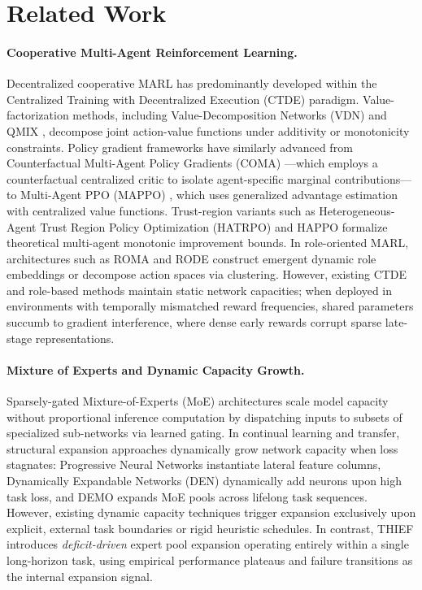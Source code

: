 \section{Related Work}
\label{sec:related}

\paragraph{Cooperative Multi-Agent Reinforcement Learning.}
Decentralized cooperative MARL has predominantly developed within the Centralized Training with Decentralized Execution (CTDE) paradigm. Value-factorization methods, including Value-Decomposition Networks (VDN) \citep{sunehag2018value} and QMIX \citep{rashid2020monotonic}, decompose joint action-value functions under additivity or monotonicity constraints. Policy gradient frameworks have similarly advanced from Counterfactual Multi-Agent Policy Gradients (COMA) \citep{foerster2018counterfactual}---which employs a counterfactual centralized critic to isolate agent-specific marginal contributions---to Multi-Agent PPO (MAPPO) \citep{yu2022surprising}, which uses generalized advantage estimation with centralized value functions. Trust-region variants such as Heterogeneous-Agent Trust Region Policy Optimization (HATRPO) and HAPPO \citep{kuba2022trust} formalize theoretical multi-agent monotonic improvement bounds. In role-oriented MARL, architectures such as ROMA \citep{wang2020roma} and RODE \citep{wang2021rode} construct emergent dynamic role embeddings or decompose action spaces via clustering. However, existing CTDE and role-based methods maintain static network capacities; when deployed in environments with temporally mismatched reward frequencies, shared parameters succumb to gradient interference, where dense early rewards corrupt sparse late-stage representations.

\paragraph{Mixture of Experts and Dynamic Capacity Growth.}
Sparsely-gated Mixture-of-Experts (MoE) architectures \citep{shazeer2017outrageously,fedus2022switch,lepikhin2020gshard} scale model capacity without proportional inference computation by dispatching inputs to subsets of specialized sub-networks via learned gating. In continual learning and transfer, structural expansion approaches dynamically grow network capacity when loss stagnates: Progressive Neural Networks \citep{rusu2016progressive} instantiate lateral feature columns, Dynamically Expandable Networks (DEN) \citep{yoon2018lifelong} dynamically add neurons upon high task loss, and DEMO \citep{yan2021dynamically} expands MoE pools across lifelong task sequences. However, existing dynamic capacity techniques trigger expansion exclusively upon explicit, external task boundaries or rigid heuristic schedules. In contrast, THIEF introduces \emph{deficit-driven} expert pool expansion operating entirely within a single long-horizon task, using empirical performance plateaus and failure transitions as the internal expansion signal.

